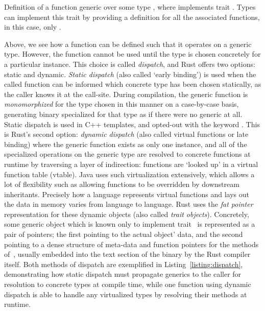 \begin{listing}[ht]
	\centering
	\inputminted[]{rust}{traits.rs}
	\caption[Generic type example in Rust.]{Definition of a function  generic over some type , where  implements trait . Types can implement this trait by providing a definition for all the associated functions, in this case, only .}
	\label{listing:traits}
\end{listing}

Above, we see how a function can be defined such that it operates on a generic type. However, the function cannot be used until the type is chosen concretely for a particular instance. This choice is called \textit{dispatch}, and Rust offers two options: static and dynamic. \textit{Static dispatch} (also called `early binding') is used when the called function can be informed which concrete type has been chosen statically, as the caller knows it at the call-site. During compilation, the generic function is \textit{monomorphized} for the type chosen in this manner on a case-by-case basis, generating binary specialized for that type as if there were no generic at all. Static dispatch is used in C++ templates, and opted-out with the keyword . This is Rust's second option: \textit{dynamic dispatch} (also called virtual functions or late binding) where the generic function exists as only one instance, and all of the specialized operations on the generic type are resolved to concrete functions at runtime by traversing a layer of indirection: functions are `looked up' in a virtual function table (vtable). Java uses such virtualization extensively, which allows a lot of flexibility such as allowing functions to be overridden by downstream inheritants. Precisely how a language represents virtual functions and lays out the data in memory varies from language to language. Rust uses the \textit{fat pointer} representation for these dynamic objects (also called \textit{trait objects}). Concretely, some generic object which is known only to implement trait~ is represented as a pair of pointers; the first pointing to the actual object' data, and the second pointing to a dense structure of meta-data and function pointers for the methods of~, usually embedded into the text section of the binary by the Rust compiler itself. Both methods of dispatch are exemplified in Listing~\ref{listing:dispatch}, demonstrating how static dispatch must propagate generics to the caller for resolution to concrete types at compile time, while one function using dynamic dispatch is able to handle any virtualized types by resolving their methods at runtime.


